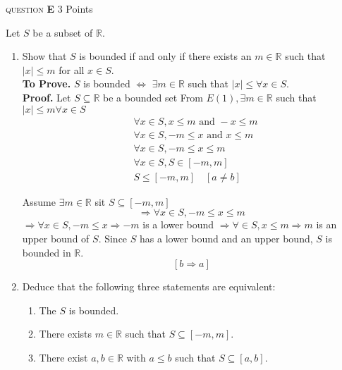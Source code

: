 \documentclass[11pt]{article}
\newcommand{\problem
}[2]{
\begin{mdframed}
    \textsc{question} \textbf{#1} \hfill #2
\end{mdframed}
}
\begin{document}
\newpage
\problem{E}{3 Points}
Let $S$ be a subset of $\mathbb{R}$.
\begin{enumerate}
	\item     Show that $S$ is bounded if and only if there exists an $m \in \mathbb{R}$ such that $|x| \leq m$ for all $x \in S$.
	      \\
	      \textbf{To Prove.} $S$ is bounded $\iff$ $\exists m \in \mathbb{R}$ such that $|x| \leq \forall x \in S$.
	      \\
	      \textbf{Proof.} Let $S \subseteq \mathbb{R}$ be a bounded set
	      From $E(1), \exists m \in \mathbb{R}$ such that $|x| \leq m \forall x \in S$
	      $$
		      \begin{aligned}
			       & \forall x \in S, x \leqslant m \text { and }-x \leqslant m \\
			       & \forall x \in S,-m \leqslant x \text { and } x \leqslant m \\
			       & \forall x \in S,-m \leqslant x \leqslant m                 \\
			       & \forall x \in S, S \in[-m, m]                              \\
			       & S \leq[-m, m] \quad[a \neq b]
		      \end{aligned}
	      $$

	      Assume $\exists m \in \mathbb{R}$ sit $S \subseteq[-m, m]$
	      $$
		      \Rightarrow \forall x \in S,-m \leqslant x \leqslant m
	      $$
	      $\Rightarrow \forall x \in S,-m \leqslant x \Rightarrow-m$ is a lower bound
	      $\Rightarrow \forall \in S, x \leqslant m \Rightarrow m$ is an upper bound of $S$.
	      Since $S$ has a lower bound and an upper bound, $S$ is bounded in $\mathbb{R}$.
	      $$
		      [b \Rightarrow a]
	      $$	\item  Deduce that the following three statements are equivalent:
	      \begin{enumerate}
		      \item The $S$ is bounded.
		      \item There exists $m \in \mathbb{R}$ such that $S \subseteq[-m, m]$.
		      \item There exist $a, b \in \mathbb{R}$ with $a \leq b$ such that $S \subseteq[a, b]$.
	      \end{enumerate}
\end{enumerate}
\end{document}
